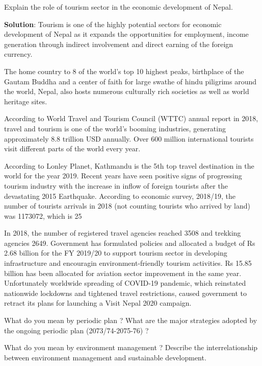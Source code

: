 \documentclass[
  openany]{book}
\newcommand{\question}{\item}
\newenvironment{solution}{ {\bfseries Solution}:}{}
\begin{document}
\begin{questions}
\question Explain the role of tourism sector in the economic development of Nepal.

\begin{solution}
Tourism is one of the highly potential sectors for economic development of Nepal as it expands the opportunities for employment, income generation through indirect involvement and direct earning of the foreign currency.

The home country to 8 of the world's top 10 highest peaks, birthplace of the Gautam Buddha and a center of faith for large swathe of hindu piligrims around the world, Nepal, also hosts numerous culturally rich societies as well as world heritage sites.

According to World Travel and Tourism Council (WTTC) annual report in 2018, travel and tourism is one of the world's booming industries, generating approximately 8.8 trillion USD annually. Over 600 million international tourists visit different parts of the world every year.

According to Lonley Planet, Kathmandu is the 5th top travel destination in the world for the year 2019. Recent years have seen positive signs of progressing tourism industry with the increase in inflow of foreign tourists after the devastating 2015 Earthquake. According to economic survey, 2018/19, the number of tourists arrivals in 2018 (not counting tourists who arrived by land) was 1173072, which is 25%

In 2018, the number of registered travel agencies reached 3508 and trekking agencies 2649. Government has formulated policies and allocated a budget of Rs 2.68 billion for the FY 2019/20 to support tourism sector in developing infrastructure and encouragin environment-friendly tourism activities. Rs 15.85 billion has been allocated for aviation sector improvement in the same year. Unfortunately worldwide spreading of COVID-19 pandemic, which reinstated nationwide lockdowns and tightened travel restrictions, caused government to retract its plans for launching a Visit Nepal 2020 campaign.

\end{solution}

\question What do you mean by periodic plan ? What are the major strategies adopted by the ongoing periodic plan (2073/74-2075-76) ?

\question What do you mean by environment management ? Describe the interrelationship between environment management and sustainable development.


\end{questions}
\end{document}
